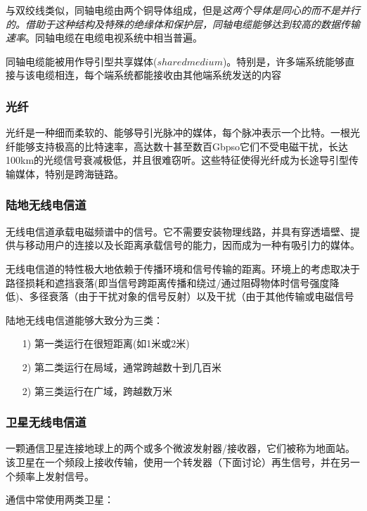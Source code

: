     与双绞线类似，同轴电缆由两个铜导体组成，但是\emph{这两个导体是同心的而不是并行的。借助于这种结构及特殊的绝缘体和保护层，同轴电缆能够达到较高的数据传输速率}。同轴电缆在电缆电视系统中相当普遍。

    同轴电缆能被用作导引型共享媒体($shared medium$)。特别是，许多端系统能够直接与该电缆相连，每个端系统都能接收由其他端系统发送的内容

\subsubsection{光纤}

    光纤是一种细而柔软的、能够导引光脉冲的媒体，每个脉冲表示一个比特。一根光纤能够支持极高的比特速率，高达数十甚至数百Gbpso它们不受电磁干扰，长达100km的光缆信号衰减极低，并且很难窃听。这些特征使得光纤成为长途导引型传输媒体，特别是跨海链路。

\subsubsection{陆地无线电信道}

    无线电信道承载电磁频谱中的信号。它不需要安装物理线路，并具有穿透墙壁、提供与移动用户的连接以及长距离承载信号的能力，因而成为一种有吸引力的媒体。
    
    无线电信道的特性极大地依赖于传播环境和信号传输的距离。环境上的考虑取决于路径损耗和遮挡衰落(即当信号跨距离传播和绕过/通过阻碍物体时信号强度降低)、多径衰落（由于干扰对象的信号反射）以及干扰（由于其他传输或电磁信号

    陆地无线电信道能够大致分为三类：

\begin{itemize}
    \item [1)] 第一类运行在很短距离(如1米或2米)
    \item [2)] 第二类运行在局域，通常跨越数十到几百米
    \item [2)] 第三类运行在广域，跨越数万米
\end{itemize}

\subsubsection{卫星无线电信道}

    一颗通信卫星连接地球上的两个或多个微波发射器/接收器，它们被称为地面站。该卫星在一个频段上接收传输，使用一个转发器（下面讨论）再生信号，并在另一个频率上发射信号。

    通信中常使用两类卫星：

